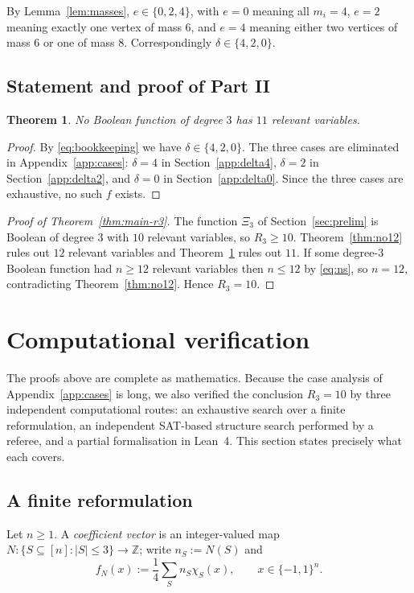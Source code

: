 \documentclass[11pt,reqno]{amsart}
\theoremstyle{plain}
\newtheorem{theorem}{Theorem}
\theoremstyle{definition}
\numberwithin{theorem}{section}
\newcommand{\cube}{\{-1,1\}}
\newcommand{\bbZ}{\mathbb{Z}}
\newcommand{\XiC}{\Xi}
\begin{document}
By Lemma~\ref{lem:masses}, $e \in \{0, 2, 4\}$, with $e = 0$ meaning all $m_i = 4$, $e = 2$
meaning exactly one vertex of mass $6$, and $e = 4$ meaning either two vertices of mass $6$ or
one of mass $8$. Correspondingly $\delta \in \{4, 2, 0\}$.

\subsection{Statement and proof of Part II}

\begin{theorem}\label{thm:no11}
No Boolean function of degree $3$ has $11$ relevant variables.
\end{theorem}

\begin{proof}
By \eqref{eq:bookkeeping} we have $\delta \in \{4, 2, 0\}$. The three cases are eliminated in
Appendix~\ref{app:cases}: $\delta = 4$ in Section~\ref{app:delta4}, $\delta = 2$ in
Section~\ref{app:delta2}, and $\delta = 0$ in Section~\ref{app:delta0}. Since the three cases
are exhaustive, no such $f$ exists.
\end{proof}

\begin{proof}[Proof of Theorem~\ref{thm:main-r3}]
The function $\XiC_3$ of Section~\ref{sec:prelim} is Boolean of degree $3$ with $10$ relevant
variables, so $R_3 \ge 10$. Theorem~\ref{thm:no12} rules out $12$ relevant variables and
Theorem~\ref{thm:no11} rules out $11$. If some degree-$3$ Boolean function had
$n \ge 12$ relevant variables then $n \le 12$ by \eqref{eq:ns}, so $n = 12$, contradicting
Theorem~\ref{thm:no12}. Hence $R_3 = 10$.
\end{proof}

\section{Computational verification}\label{sec:comput}

The proofs above are complete as mathematics. Because the case analysis of
Appendix~\ref{app:cases} is long, we also verified the conclusion $R_3 = 10$ by three
independent computational routes: an exhaustive search over a finite reformulation, an
independent SAT-based structure search performed by a referee, and a partial formalisation in
Lean~4. This section states precisely what each covers.

\subsection{A finite reformulation}\label{sec:finite}
Let $n \ge 1$. A \emph{coefficient vector} is an integer-valued map
$N \colon \{S \subseteq [n] : |S| \le 3\} \to \bbZ$; write $n_S := N(S)$ and
\[
  f_N(x) := \frac14 \sum_{S} n_S \chi_S(x), \qquad x \in \cube^n .
\]
\end{document}
